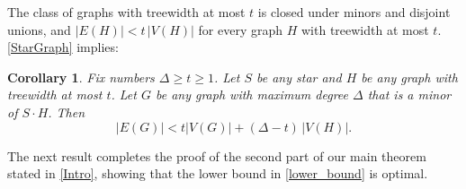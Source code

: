 \documentclass{patmorin}
\renewcommand{\geq}{\geqslant}
\renewcommand{\leq}{\leqslant}
\theoremstyle{plain}
\newtheorem{cor}[thm]{Corollary}
\theoremstyle{definition}
\begin{document}
%
%
%

The class of graphs with treewidth at most $t$ is closed under minors and disjoint unions, and $|E(H)|<t\,|V(H)|$ for every graph $H$ with treewidth at most $t$. \cref{StarGraph} implies:

\begin{cor}
\label{StarTreewidth}
Fix numbers $\Delta\geq t\geq 1$. Let $S$ be any star and $H$ be any graph with treewidth at most $t$. Let $G$ be any graph with maximum degree $\Delta$ that is a minor of $S \cdot H$. Then 
$$|E(G)|< t|V(G)|+(\Delta-t)\,|V(H)|.$$ 
\end{cor}

The next result completes the proof of the second part of our main theorem stated in \cref{Intro}, showing that the lower bound in \cref{lower_bound} is optimal.
\end{document}
